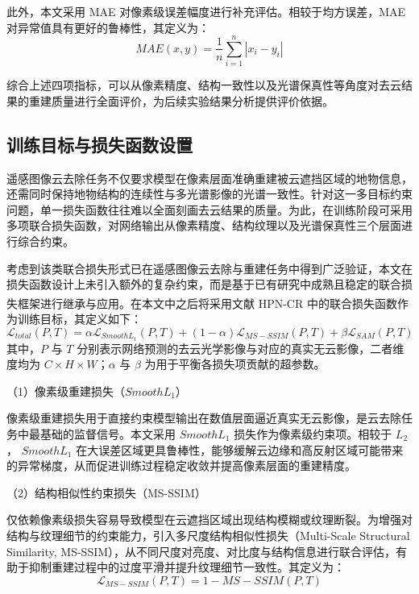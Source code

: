此外，本文采用 MAE 对像素级误差幅度进行补充评估。相较于均方误差，MAE 对异常值具有更好的鲁棒性，其定义为：
\begin{equation}
MAE(x, y) = \frac{1}{n} \sum_{i=1}^{n} |x_i - y_i|
\end{equation}

综合上述四项指标，可以从像素精度、结构一致性以及光谱保真性等角度对去云结果的重建质量进行全面评价，为后续实验结果分析提供评价依据。

\subsection{训练目标与损失函数设置}

遥感图像云去除任务不仅要求模型在像素层面准确重建被云遮挡区域的地物信息，还需同时保持地物结构的连续性与多光谱影像的光谱一致性。针对这一多目标约束问题，单一损失函数往往难以全面刻画去云结果的质量。为此，在训练阶段可采用多项联合损失函数，对网络输出从像素精度、结构纹理以及光谱保真性三个层面进行综合约束。

考虑到该类联合损失形式已在遥感图像云去除与重建任务中得到广泛验证，本文在损失函数设计上未引入额外的复杂约束，而是基于已有研究中成熟且稳定的联合损失框架进行继承与应用。在本文中之后将采用文献 HPN-CR \textsuperscript{\cite{gu2025hpn}} 中的联合损失函数作为训练目标，其定义如下：
\begin{equation}
\mathcal{L}_{total}(P, T) 
= \alpha \mathcal{L}_{SmoothL_1}(P, T)
+ (1 - \alpha) \mathcal{L}_{MS-SSIM}(P, T)
+ \beta \mathcal{L}_{SAM}(P, T)
\label{eq:loss_total}
\end{equation}
其中，$P$ 与 $T$ 分别表示网络预测的去云光学影像与对应的真实无云影像，二者维度均为 $C \times H \times W$；$\alpha$ 与 $\beta$ 为用于平衡各损失项贡献的超参数。

（1）像素级重建损失（$SmoothL_1$）

像素级重建损失用于直接约束模型输出在数值层面逼近真实无云影像，是云去除任务中最基础的监督信号。本文采用 $SmoothL_1$ 损失作为像素级约束项。相较于 $L_2$ ， $SmoothL_1$ 在大误差区域更具鲁棒性，能够缓解云边缘和高反射区域可能带来的异常梯度，从而促进训练过程稳定收敛并提高像素层面的重建精度。

（2）结构相似性约束损失（MS-SSIM）

仅依赖像素级损失容易导致模型在云遮挡区域出现结构模糊或纹理断裂。为增强对结构与纹理细节的约束能力，引入多尺度结构相似性损失（Multi-Scale Structural Similarity, MS-SSIM），从不同尺度对亮度、对比度与结构信息进行联合评估，有助于抑制重建过程中的过度平滑并提升纹理细节一致性。其定义为：
\begin{equation}
\mathcal{L}_{MS-SSIM}(P, T)
= 1 - {MS-SSIM}(P, T)
\label{eq:loss_msssim}
\end{equation}

